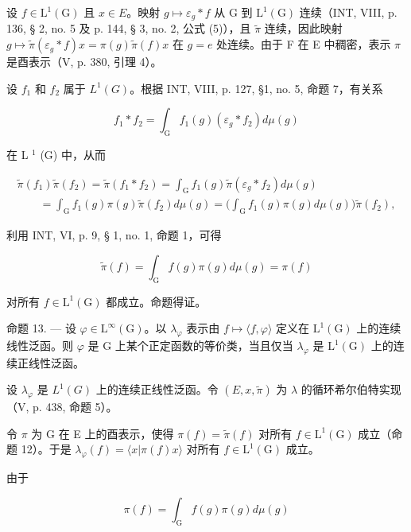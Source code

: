 设 \(f \in \mathrm{L}^{1}(\mathrm{G})\) 且 \(x \in E\)。映射 \(g \mapsto \varepsilon_{g} * f\) 从 G 到 \(\mathrm{L}^{1}(\mathrm{G})\) 连续（INT, VIII, p. 136, § 2, no. 5 及 p. 144, § 3, no. 2, 公式 (5)），且 \(\widetilde{\pi}\) 连续，因此映射 \(g \mapsto \widetilde{\pi}(\varepsilon_{g} * f)x = \pi(g)\widetilde{\pi}(f)x\) 在 \(g = e\) 处连续。由于 F 在 E 中稠密，表示 \(\pi\) 是酉表示（V, p. 380, 引理 4）。

设 \(f_1\) 和 \(f_2\) 属于 \(L^1(G)\)。根据 INT, VIII, p. 127, §1, no. 5, 命题 7，有关系

\[
f _ {1} * f _ {2} = \int_ {\mathrm{G}} f _ {1} (g) (\varepsilon_ {g} * f _ {2}) d \mu (g)
\]

在 L \(^{1}\) (G) 中，从而

\[
\begin{array}{l} \widetilde {\pi} (f _ {1}) \widetilde {\pi} (f _ {2}) = \widetilde {\pi} (f _ {1} * f _ {2}) = \int_ {\mathrm{G}} f _ {1} (g) \widetilde {\pi} (\varepsilon_ {g} * f _ {2}) d \mu (g) \\ \qquad = \int_ {\mathrm{G}} f _ {1} (g) \pi (g) \widetilde {\pi} (f _ {2}) d \mu (g) = \Big (\int_ {\mathrm{G}} f _ {1} (g) \pi (g) d \mu (g) \Big) \widetilde {\pi} (f _ {2}), \end{array}
\]

利用 INT, VI, p. 9, § 1, no. 1, 命题 1，可得

\[
\widetilde {\pi} (f) = \int_ {\mathrm{G}} f (g) \pi (g) d \mu (g) = \pi (f)
\]

对所有 \(f \in \mathrm{L}^{1}(\mathrm{G})\) 都成立。命题得证。

命题 13. --- 设 \(\varphi\in\mathrm{L}^{\infty}(\mathrm{G})\)。以 \(\lambda_{\varphi}\) 表示由 \(f\mapsto\langle f,\varphi\rangle\) 定义在 \(\mathrm{L}^{1}(\mathrm{G})\) 上的连续线性泛函。则 \(\varphi\) 是 G 上某个正定函数的等价类，当且仅当 \(\lambda_{\varphi}\) 是 \(\mathrm{L}^{1}(\mathrm{G})\) 上的连续正线性泛函。

设 \(\lambda_{\varphi}\) 是 \(L^{1}(G)\) 上的连续正线性泛函。令 \((E, x, \widetilde{\pi})\) 为 \(\lambda\) 的循环希尔伯特实现（V, p. 438, 命题 5）。

令 \(\pi\) 为 G 在 E 上的酉表示，使得 \(\pi(f) = \widetilde{\pi}(f)\) 对所有 \(f \in \mathrm{L}^1(\mathrm{G})\) 成立（命题 12）。于是 \(\lambda_{\varphi}(f) = \langle x | \pi(f)x \rangle\) 对所有 \(f \in \mathrm{L}^1(\mathrm{G})\) 成立。

由于

\[
\pi (f) = \int_ {\mathrm{G}} f (g) \pi (g) d \mu (g)
\]

